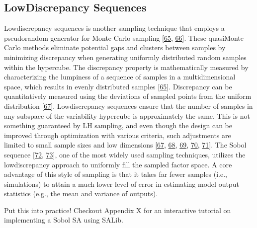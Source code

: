 \documentclass[letterpaper,10pt,english]{sphinxmanual}
\begin{document}
\subsection{Low\sphinxhyphen{}Discrepancy Sequences}
\label{\detokenize{3_sensitivity_analysis_the_basics:low-discrepancy-sequences}}
\sphinxAtStartPar
Low\sphinxhyphen{}discrepancy sequences is another sampling technique that employs a pseudo\sphinxhyphen{}random generator for Monte Carlo sampling {[}\hyperlink{cite.index:id81}{65}, \hyperlink{cite.index:id92}{66}{]}. These quasi\sphinxhyphen{}Monte Carlo methods eliminate potential gaps and clusters between samples by minimizing discrepancy when generating uniformly distributed random samples within the hypercube. The discrepancy property is mathematically measured by characterizing the lumpiness of a sequence of samples in a multidimensional space, which results in evenly distributed samples {[}\hyperlink{cite.index:id81}{65}{]}. Discrepancy can be quantitatively measured using the deviations of sampled points from the uniform distribution {[}\hyperlink{cite.index:id95}{67}{]}. Low\sphinxhyphen{}discrepancy sequences ensure that the number of samples in any subspace of the variability hypercube is approximately the same. This is not something guaranteed by LH sampling, and even though the design can be improved through optimization with various criteria, such adjustments are limited to small sample sizes and low dimensions {[}\hyperlink{cite.index:id95}{67}, \hyperlink{cite.index:id93}{68}, \hyperlink{cite.index:id94}{69}, \hyperlink{cite.index:id96}{70}, \hyperlink{cite.index:id97}{71}{]}. The Sobol sequence {[}\hyperlink{cite.index:id98}{72}, \hyperlink{cite.index:id99}{73}{]}, one of the most widely used sampling techniques, utilizes the low\sphinxhyphen{}discrepancy approach to uniformly fill the sampled factor space. A core advantage of this style of sampling is that it takes far fewer samples (i.e., simulations) to attain a much lower level of error in estimating model output statistics (e.g., the mean and variance of outputs).


\nopagebreak


\sphinxAtStartPar
Put this into practice! Checkout Appendix X for an interactive tutorial on implementing a Sobol SA using SALib.
\end{document}
